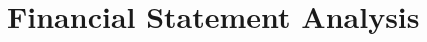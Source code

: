\section{Financial Statement Analysis}



\newpage



\newpage



\newpage



\newpage



\newpage



\newpage



\newpage



\newpage



\newpage


